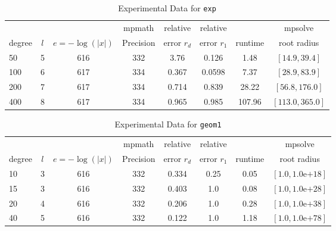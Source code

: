 \documentclass[sigconf]{acmart}
\begin{document}
\begin{table}[t]
\caption{Experimental Data for \texttt{exp}} %
\label{tab:exp}
\vskip -0.15in
\begin{center}
\begin{small}
\begin{sc}
\begin{tabular}{lccccccc}
\toprule
&  &  & mpmath & relative  & relative &  & mpsolve \\
degree  & $l$& $e=-\log(|x|)$& Precision &error $r_d$       & error $r_1$ &runtime& root radius\\
\midrule
 50 & 5 & 616 & 332 & 3.76 & 0.126 & 1.48 & $[14.9, 39.4]$\\
100 & 6 & 617 & 334 & 0.367 & 0.0598 & 7.37 & $[28.9, 83.9]$\\
 200 & 7 & 617 & 334 & 0.714 & 0.839 & 28.22 & $[56.8, 176.0]$\\
 400 & 8 & 617 & 334 & 0.965 & 0.985 & 107.96 & $[113.0, 365.0]$\\
\bottomrule
\end{tabular}
\end{sc}
\end{small}
\end{center}
\vskip 0.05in
\end{table}

\begin{table}[t]
\caption{Experimental Data for \texttt{geom1}} %
\label{tab:geom1}
\vskip -0.15in
\begin{center}
\begin{small}
\begin{sc}
\begin{tabular}{lccccccc}
\toprule
&  &  & mpmath & relative  & relative &  & mpsolve \\
degree  & $l$& $e=-\log(|x|)$& Precision &error $r_d$       & error $r_1$ &runtime& root radius\\
\midrule
 10 & 3 & 616 & 332 & 0.334 & 0.25 & 0.05 & $[1.0, 1.0\text{e+}18]$\\
 15 & 3 & 616 & 332 & 0.403 & 1.0 & 0.08 & $[1.0, 1.0\text{e+}28]$\\
 20 & 4 & 616 & 332 & 0.206 & 1.0 & 0.28 & $[1.0, 1.0\text{e+}38]$\\
 40 & 5 & 616 & 332 & 0.122 & 1.0 & 1.18 & $[1.0, 1.0\text{e+}78]$\\
\bottomrule
\end{tabular}
\end{sc}
\end{small}
\end{center}
\vskip 0.05in
\end{table}
\end{document}
